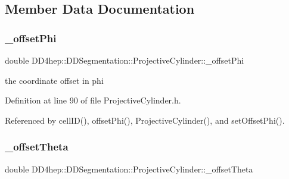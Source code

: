 \subsection{Member Data Documentation}
\hypertarget{class_d_d4hep_1_1_d_d_segmentation_1_1_projective_cylinder_aef1c8efbfba086c1df77dee8d24eb877}{}\label{class_d_d4hep_1_1_d_d_segmentation_1_1_projective_cylinder_aef1c8efbfba086c1df77dee8d24eb877} 
\subsubsection{\texorpdfstring{\+\_\+offset\+Phi}{\_offsetPhi}}
{\footnotesize\ttfamily double D\+D4hep\+::\+D\+D\+Segmentation\+::\+Projective\+Cylinder\+::\+\_\+offset\+Phi\hspace{0.3cm}{\ttfamily [protected]}}



the coordinate offset in phi 



Definition at line 90 of file Projective\+Cylinder.\+h.



Referenced by cell\+I\+D(), offset\+Phi(), Projective\+Cylinder(), and set\+Offset\+Phi().

\hypertarget{class_d_d4hep_1_1_d_d_segmentation_1_1_projective_cylinder_afb07d1274b199b7d48c6c915e149e5a6}{}\label{class_d_d4hep_1_1_d_d_segmentation_1_1_projective_cylinder_afb07d1274b199b7d48c6c915e149e5a6} 
\subsubsection{\texorpdfstring{\+\_\+offset\+Theta}{\_offsetTheta}}
{\footnotesize\ttfamily double D\+D4hep\+::\+D\+D\+Segmentation\+::\+Projective\+Cylinder\+::\+\_\+offset\+Theta\hspace{0.3cm}{\ttfamily [protected]}}



